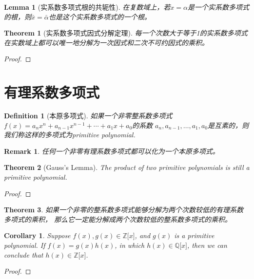 \documentclass[onecolumn]{ctexart}
\newtheorem{definition}{Definition}
\newtheorem{theorem}{Theorem}
\newtheorem{lemma}{Lemma}
\newtheorem{corollary}{Corollary}
\newtheorem{remark}{Remark}
\begin{document}
\begin{lemma}[实系数多项式根的共轭性]
  在复数域上，若$x = \alpha$是一个实系数多项式的根，则$\bar{x} = \bar{\alpha}$也是这个实系数多项式的一个根。
\end{lemma}

\begin{theorem}[实系数多项式因式分解定理]
  每一个次数大于等于1的实系数多项式在实数域上都可以唯一地分解为一次因式和二次不可约因式的乘积。
\end{theorem}
\begin{proof}
  
\end{proof}

\section{有理系数多项式}
\begin{definition}[本原多项式]
  如果一个非零整系数多项式$f(x) = a_n x^n + a_{n-1} x^{n-1} + \cdots + a_1 x + a_0$的系数
  $a_n, a_{n-1}, \ldots, a_1, a_0$是互素的，则我们称这样的多项式为primitive polynomial.
\end{definition}
\begin{remark}
  任何一个非零有理系数多项式都可以化为一个本原多项式。
\end{remark}

\begin{theorem}[Gauss's Lemma]
  The product of two primitive polynomials is still a primitive polynomial.
\end{theorem}
\begin{proof}
  
\end{proof}

\begin{theorem}
  如果一个非零的整系数多项式能够分解为两个次数较低的有理系数多项式的乘积，
  那么它一定能分解成两个次数较低的整系数多项式的乘积。
\end{theorem}

\begin{corollary}
  Suppose $f(x), g(x) \in \mathbb{Z}\lbrack x \rbrack$, and $g(x)$ is a 
  primitive polynomial. If $f(x) = g(x)h(x)$, in which $h(x) \in \mathbb{Q}
  \lbrack x \rbrack$, then we can conclude that $h(x) \in \mathbb{Z}\lbrack x 
  \rbrack$.
\end{corollary}
\begin{proof}
  
\end{proof}
\end{document}
